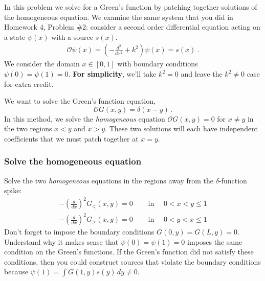 \documentclass[12pt]{article}
\numberwithin{equation}{subsection}    %
\renewcommand{\tilde}{\widetilde}   %
\begin{document}
%
In this problem we solve for a Green's function by patching together solutions of the homogeneous equation.  We examine the same system that you did in Homework 4, Problem \#2: consider a second order differential equation acting on a state $\psi(x)$ with a source $s(x)$. 
\begin{align*}
\mathcal O \psi(x) = 
	\left(-\frac{d^2}{dx^2} + k^2 \right) \psi(x) = s(x) \ .
\end{align*}
We consider the domain $x\in[0,1]$ with boundary conditions $\psi(0) = \psi(1) = 0$. \textbf{For simplicity}, we'll take $k^2 = 0$ and leave the $k^2 \neq 0$ case for extra credit.



We want to solve the Green's function equation, $$\mathcal O G(x,y) = \delta(x-y)\, .$$ In this method, we solve the \emph{homogeneous} equation $\mathcal O G(x,y) = 0$ for $x\neq y$ in the two regions $x<y$ and $x>y$. These two solutions will each have independent coefficients that we must patch together at $x=y$.

\subsubsection{Solve the homogeneous equation}

Solve the two \emph{homogeneous} equations in the regions away from the $\delta$-function spike:
\begin{align}
 	-\left(\frac{d}{dx}\right)^2 G_{<}(x,y) = 0  
 	& \quad\text{ in }\quad 0 < x < y \leq 1 
 	\\
 	-\left(\frac{d}{dx}\right)^2 G_{>}(x,y) = 0  
 	& \quad\text{ in }\quad 0 < y < x \leq 1
\end{align}
Don't forget to impose the boundary conditions $G(0, y) = G(L,y) = 0$. Understand why it makes sense that $\psi(0) = \psi(1) = 0$ imposes the same condition on the Green's functions. If the Green's function did not satisfy these conditions, then you could construct sources that violate the boundary conditions because $\psi(1) = \int G(1,y) s(y)\, dy \neq 0$.
\end{document}
